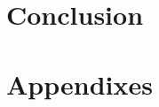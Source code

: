 \documentclass[twocolumn]{autart}    %
\begin{document}
\section{Conclusion}

\section{Appendixes}
\end{document}
